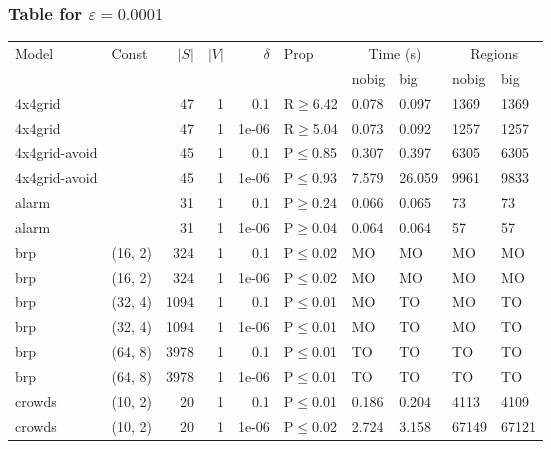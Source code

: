 \subsubsection{Table for \(\varepsilon=0.0001\)}
\begin{longtable}{llrrrlllll}

        \toprule
        Model & Const & $|S|$ & $|V|$ & $\delta$ & Prop & \multicolumn{2}{c}{Time (s)} & \multicolumn{2}{c}{Regions} \\
        \cmidrule(ll){7-8} \cmidrule(ll){9-10}
        & & & & & & nobig & big & nobig & big \\
        \midrule
        
 4x4grid       &           &     	47 & 1 & 0.1   & R$\geq$6.42  & 0.078   & 0.097    & 1369   & 1369   \\
 4x4grid       &           &     	47 & 1 & 1e-06 & R$\geq$5.04  & 0.073   & 0.092    & 1257   & 1257   \\
 4x4grid-avoid &           &     	45 & 1 & 0.1   & P$\leq$0.85  & 0.307   & 0.397    & 6305   & 6305   \\
 4x4grid-avoid &           &     	45 & 1 & 1e-06 & P$\leq$0.93  & 7.579   & 26.059   & 9961   & 9833   \\
 alarm         &           &     	31 & 1 & 0.1   & P$\geq$0.24  & 0.066   & 0.065    & 73     & 73     \\
 alarm         &           &     	31 & 1 & 1e-06 & P$\geq$0.04  & 0.064   & 0.064    & 57     & 57     \\
 brp           & (16, 2)   &    	324 & 1 & 0.1   & P$\leq$0.02  & MO      & MO       & MO     & MO     \\
 brp           & (16, 2)   &    	324 & 1 & 1e-06 & P$\leq$0.02  & MO      & MO       & MO     & MO     \\
 brp           & (32, 4)   &   	1094 & 1 & 0.1   & P$\leq$0.01  & MO      & TO       & MO     & TO     \\
 brp           & (32, 4)   &   	1094 & 1 & 1e-06 & P$\leq$0.01  & MO      & TO       & MO     & TO     \\
 brp           & (64, 8)   &   	3978 & 1 & 0.1   & P$\leq$0.01  & TO      & TO       & TO     & TO     \\
 brp           & (64, 8)   &   	3978 & 1 & 1e-06 & P$\leq$0.01  & TO      & TO       & TO     & TO     \\
 crowds        & (10, 2)   &     	20 & 1 & 0.1   & P$\leq$0.01  & 0.186   & 0.204    & 4113   & 4109   \\
 crowds        & (10, 2)   &     	20 & 1 & 1e-06 & P$\leq$0.02  & 2.724   & 3.158    & 67149  & 67121  \\

\end{longtable}
